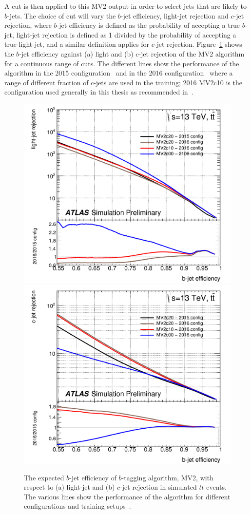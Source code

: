 A cut is then applied to this MV2 output in order to select jets that are likely to $b$-jets.
The choice of cut will vary the $b$-jet efficiency, light-jet rejection and $c$-jet rejection,
where $b$-jet efficiency is defined as the probability of accepting a true $b$-jet,
light-jet rejection is defined as 1 divided by the probability of accepting a true light-jet, and a similar definition applies for $c$-jet rejection.
Figure~\ref{fig:obj-bjets_perf} shows the $b$-jet efficiency against (a) light and (b) $c$-jet rejection of the MV2 algorithm for a continuous range of cuts.
The different lines show the performance of the algorithm in the 2015 configuration~\cite{obj-bjets_algo_2015}
and in the 2016 configuration~\cite{obj-bjets_algo_2016} where a range of different fraction of $c$-jets are used in the training;
2016 MV2c10 is the configuration used generally in this thesis as recommended in~\cite{obj-bjets_algo_2016}.
    
\begin{figure}[!ht]
  \begin{center}
    \captionsetup[subfigure]{aboveskip=0pt,justification=centering}
    \subcaptionbox{} {\includegraphics[width=0.48\linewidth, angle=0]{figs/Objects/bjets_perf_light}}
    \subcaptionbox{} { \includegraphics[width=0.48\linewidth, angle=0]{figs/Objects/bjets_perf_charm}}
  \end{center}
  \caption[The expected $b$-jet efficiency of $b$-tagging algorithm, MV2, with respect to
    (a) light-jet and (b) $c$-jet rejection in simulated $t\bar{t}$ events.
    The various lines show the performance of the algorithm for different configurations and training setups.]
    {The expected $b$-jet efficiency of $b$-tagging algorithm, MV2, with respect to
    (a) light-jet and (b) $c$-jet rejection in simulated $t\bar{t}$ events.
    The various lines show the performance of the algorithm for different configurations and training setups~\cite{obj-bjets_algo_2016}.}
  \label{fig:obj-bjets_perf}
\end{figure}

